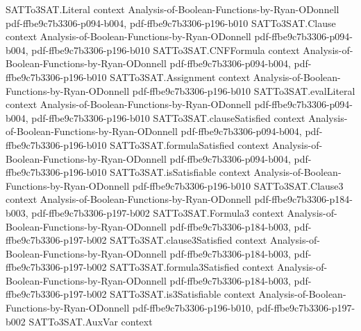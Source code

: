 \begin{theorem}
\label{SATTo3SAT.SAT_to_3SAT_equivalence}
\leanok
{}
\proofstep
  {SATTo3SAT.Literal}
  {context}
  {Analysis-of-Boolean-Functions-by-Ryan-ODonnell}
  {pdf-ffbe9c7b3306-p094-b004,
    pdf-ffbe9c7b3306-p196-b010}
\proofstep
  {SATTo3SAT.Clause}
  {context}
  {Analysis-of-Boolean-Functions-by-Ryan-ODonnell}
  {pdf-ffbe9c7b3306-p094-b004,
    pdf-ffbe9c7b3306-p196-b010}
\proofstep
  {SATTo3SAT.CNFFormula}
  {context}
  {Analysis-of-Boolean-Functions-by-Ryan-ODonnell}
  {pdf-ffbe9c7b3306-p094-b004,
    pdf-ffbe9c7b3306-p196-b010}
\proofstep
  {SATTo3SAT.Assignment}
  {context}
  {Analysis-of-Boolean-Functions-by-Ryan-ODonnell}
  {pdf-ffbe9c7b3306-p196-b010}
\proofstep
  {SATTo3SAT.evalLiteral}
  {context}
  {Analysis-of-Boolean-Functions-by-Ryan-ODonnell}
  {pdf-ffbe9c7b3306-p094-b004,
    pdf-ffbe9c7b3306-p196-b010}
\proofstep
  {SATTo3SAT.clauseSatisfied}
  {context}
  {Analysis-of-Boolean-Functions-by-Ryan-ODonnell}
  {pdf-ffbe9c7b3306-p094-b004,
    pdf-ffbe9c7b3306-p196-b010}
\proofstep
  {SATTo3SAT.formulaSatisfied}
  {context}
  {Analysis-of-Boolean-Functions-by-Ryan-ODonnell}
  {pdf-ffbe9c7b3306-p094-b004,
    pdf-ffbe9c7b3306-p196-b010}
\proofstep
  {SATTo3SAT.isSatisfiable}
  {context}
  {Analysis-of-Boolean-Functions-by-Ryan-ODonnell}
  {pdf-ffbe9c7b3306-p196-b010}
\proofstep
  {SATTo3SAT.Clause3}
  {context}
  {Analysis-of-Boolean-Functions-by-Ryan-ODonnell}
  {pdf-ffbe9c7b3306-p184-b003,
    pdf-ffbe9c7b3306-p197-b002}
\proofstep
  {SATTo3SAT.Formula3}
  {context}
  {Analysis-of-Boolean-Functions-by-Ryan-ODonnell}
  {pdf-ffbe9c7b3306-p184-b003,
    pdf-ffbe9c7b3306-p197-b002}
\proofstep
  {SATTo3SAT.clause3Satisfied}
  {context}
  {Analysis-of-Boolean-Functions-by-Ryan-ODonnell}
  {pdf-ffbe9c7b3306-p184-b003,
    pdf-ffbe9c7b3306-p197-b002}
\proofstep
  {SATTo3SAT.formula3Satisfied}
  {context}
  {Analysis-of-Boolean-Functions-by-Ryan-ODonnell}
  {pdf-ffbe9c7b3306-p184-b003,
    pdf-ffbe9c7b3306-p197-b002}
\proofstep
  {SATTo3SAT.is3Satisfiable}
  {context}
  {Analysis-of-Boolean-Functions-by-Ryan-ODonnell}
  {pdf-ffbe9c7b3306-p196-b010,
    pdf-ffbe9c7b3306-p197-b002}
\proofstep
  {SATTo3SAT.AuxVar}
  {context}

\end{theorem}
